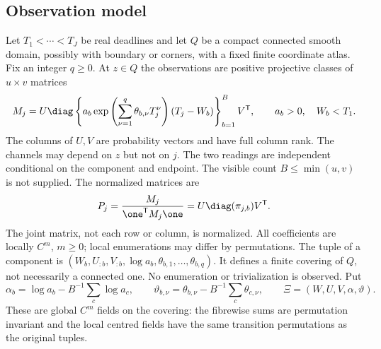 \subsection{Observation model}
Let $T_1<\cdots<T_J$ be real deadlines and let $Q$ be a compact connected
smooth domain, possibly with boundary or corners, with a fixed finite
coordinate atlas. Fix an integer $q\ge0$. At $z\in Q$ the observations
are positive projective classes of $u\times v$ matrices
\begin{equation}\label{eq:v83-model}
 M_j=U\diag\left\{a_b\exp\left(\sum_{\nu=1}^q
 \theta_{b,\nu}T_j^\nu\right)(T_j-W_b)\right\}_{b=1}^B V^{\mathsf T},
 \qquad a_b>0,\quad W_b<T_1.
\end{equation}
The columns of $U,V$ are probability vectors and have full column rank.
The channels may depend on $z$ but not on $j$. The two readings are
independent conditional on the component and endpoint. The visible count
$B\le\min(u,v)$ is not supplied. The normalized matrices are
\begin{equation}\label{eq:v83-probability}
 P_j=\frac{M_j}{\one^{\mathsf T}M_j\one}
     =U\diag(\pi_{j,b})V^{\mathsf T}.
\end{equation}
The joint matrix, not each row or column, is normalized. All coefficients
are locally $C^m$, $m\ge0$; local enumerations may differ by permutations.
The tuple of a component is
$(W_b,U_{:b},V_{:b},\log a_b,\theta_{b,1},\ldots,\theta_{b,q})$.
It defines a finite covering of $Q$, not necessarily a connected one.
No enumeration or trivialization is observed. Put
\begin{equation}\label{eq:v83-center}
 \alpha_b=\log a_b-B^{-1}\sum_c\log a_c,\qquad
 \vartheta_{b,\nu}=\theta_{b,\nu}-B^{-1}\sum_c\theta_{c,\nu},
 \qquad \Xi=(W,U,V,\alpha,\vartheta).
\end{equation}
These are global $C^m$ fields on the covering: the fibrewise sums are
permutation invariant and the local centred fields have the same
transition permutations as the original tuples.

